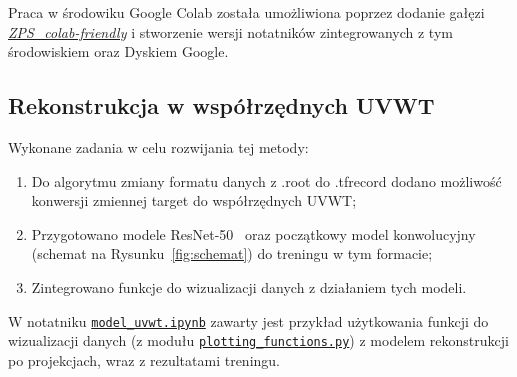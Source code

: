 \documentclass{article}
\begin{document}
Praca w środowiku Google Colab została umożliwiona poprzez dodanie gałęzi \href{https://github.com/mwbaj/MachineLearning/tree/ZPS_colab-friendly}{\textit{ZPS\_colab-friendly}} i stworzenie wersji notatników zintegrowanych z tym środowiskiem oraz Dyskiem Google. 
\subsection{Rekonstrukcja w współrzędnych UVWT}
Wykonane zadania w celu rozwijania tej metody:
\begin{enumerate}
    \item Do algorytmu zmiany formatu danych z .root do .tfrecord dodano możliwość konwersji zmiennej target do współrzędnych UVWT;
    \item Przygotowano modele ResNet-50~\cite{ResNet} oraz początkowy model konwolucyjny (schemat na Rysunku~\ref{fig:schemat}) do treningu w tym formacie;
    \item Zintegrowano funkcje do wizualizacji danych z działaniem tych modeli.
\end{enumerate}
W notatniku \href{https://github.com/mwbaj/MachineLearning/blob/ZPS_2023_winter/WAWTPC/uvwt_model.ipynb}{\texttt{model\_uvwt.ipynb}} zawarty jest przykład użytkowania funkcji do wizualizacji danych (z modułu \href{https://github.com/mwbaj/MachineLearning/blob/ZPS_2023_winter/WAWTPC/plotting_functions.py}{\texttt{plotting\_functions.py}}) z modelem rekonstrukcji po projekcjach, wraz z rezultatami treningu.
\end{document}
